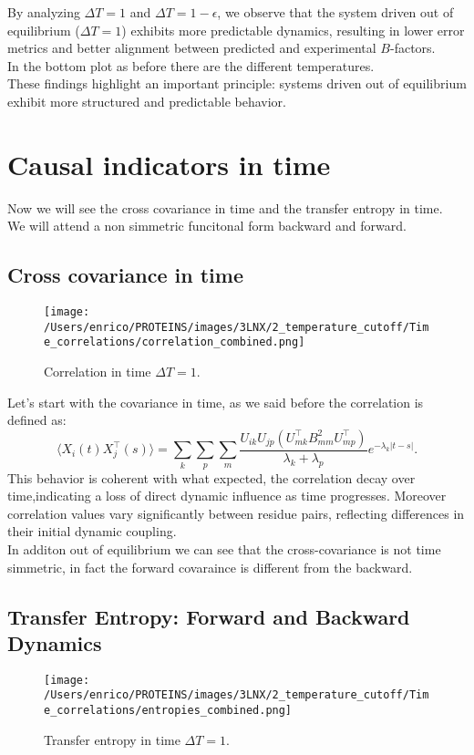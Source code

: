 \documentclass[English, Lau, oneside]{sapthesis}
\begin{document}
By analyzing \(\Delta T = 1\) and \(\Delta T = 1 - \epsilon \), we observe that the system driven out of equilibrium (\(\Delta T = 1\)) exhibits more predictable dynamics, resulting in lower error metrics and better alignment between predicted and experimental \( B \)-factors. \\
In the bottom plot as before there are the different temperatures.\\

These findings highlight an important principle: systems driven out of equilibrium exhibit more structured and predictable behavior. 

\newpage
\section{Causal indicators in time}
\noindent Now we will see the cross covariance in time and the transfer entropy in time.\\
We will attend a non simmetric funcitonal form backward and forward.



\subsection{Cross covariance in time}
\begin{figure}[h!]
    \centering
    \texttt{[image: /Users/enrico/PROTEINS/images/3LNX/2\_temperature\_cutoff/Time\_correlations/correlation\_combined.png]}
    \caption{Correlation in time $\Delta T = 1$.}
\end{figure}
\noindent  Let’s start with the covariance in time, as we said before the correlation is defined
as:
\[
\langle X_i(t) X_j^\top(s) \rangle = \sum_k \sum_p \sum_m \frac{U_{ik} U_{jp} (U_{mk}^\top B_{mm}^2 U_{mp}^\top)}{\lambda_k + \lambda_p} e^{-\lambda_k |t-s|}.
\]
This behavior is coherent with what expected, the correlation decay over time,indicating a loss of direct dynamic influence as time progresses.
Moreover correlation values vary significantly between residue pairs, reflecting
differences in their initial dynamic coupling.\\
In additon out of equilibrium we can see that the cross-covariance is not time simmetric, in fact the forward covaraince is different from the backward.\\

\newpage
\subsection{Transfer Entropy: Forward and Backward Dynamics}
\begin{figure}[h!]
    \centering
    \texttt{[image: /Users/enrico/PROTEINS/images/3LNX/2\_temperature\_cutoff/Time\_correlations/entropies\_combined.png]}
    \caption{Transfer entropy in time $\Delta T = 1$.}
\end{figure}
\end{document}

